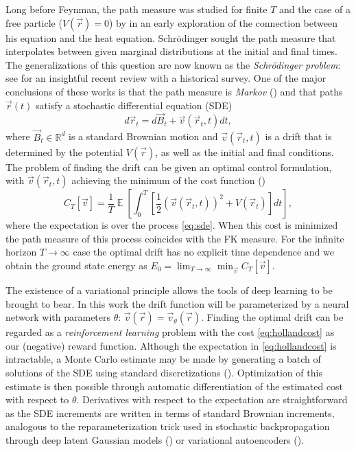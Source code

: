\documentclass[12pt]{msml2020} %
\DeclareMathOperator*{\E}{\mathbb{E}}
\begin{document}
Long before Feynman, the path measure was studied for finite $T$ and the case of a free particle ($V(\vec{r})=0$) by \cite{Schrodinger:1931aa,Schrodinger:1932aa} in an early exploration of the connection between his equation and the heat equation. Schr\"odinger sought the path measure that interpolates between given marginal distributions at the initial and final times. The generalizations of this question are now known as the \emph{Schr\"odinger problem}: see \cite{Leonard:2014aa} for an insightful recent review with a historical survey. One of the major conclusions of these works is that the path measure is \emph{Markov} (\cite{Jamison:1974aa}) and that paths $\vec{r}(t)$ satisfy a stochastic differential equation (SDE)
%
\begin{equation}\label{eq:sde}
  d\vec{r}_t = d\vec{B}_t + \vec{v}(\vec{r}_t,t)dt,
\end{equation}
%
where $\vec{B}_t\in \mathbb{R}^d$ is a standard Brownian motion and $\vec{v}(\vec{r}_t,t)$ is a drift that is determined by the potential $V(\vec{r})$, as well as the initial and final conditions. The problem of finding the drift can be given an optimal control formulation, with $\vec{v}(\vec{r}_t,t)$ achieving the minimum of the cost function (\cite{Holland:1977aa,Fleming:1977aa})
%
\begin{equation}\label{eq:hollandcost}
  C_T[\vec{v}] = \frac{1}{T}\E\left[\int_0^T\left[\frac{1}{2}(\vec{v}(\vec{r}_t,t))^2 + V(\vec{r}_t)\right]dt\right],
\end{equation}
%
where the expectation is over the process \eqref{eq:sde}. When this cost is minimized the path measure of this process coincides with the FK measure. For the infinite horizon $T\to\infty$ case the optimal drift has no explicit time dependence and we obtain the ground state energy as $E_0 = \lim_{T\to\infty} \min_{\vec{v}} C_T[\vec{v}]$.

The existence of a variational principle allows the tools of deep learning to be brought to bear. In this work the drift function will be parameterized by a neural network with parameters $\theta$: $\vec{v}(\vec{r})=\vec{v}_\theta(\vec{r})$. Finding the optimal drift can be regarded as a \emph{reinforcement learning} problem with the cost \eqref{eq:hollandcost} as our (negative) reward function. Although the expectation in \eqref{eq:hollandcost} is intractable, a Monte Carlo estimate may be made by generating a batch of solutions of the SDE using standard discretizations (\cite{Kloeden:2013aa}). Optimization of this estimate is then possible through automatic differentiation of the estimated cost with respect to $\theta$. Derivatives with respect to the expectation are straightforward as the SDE increments are written in terms of standard Brownian increments, analogous to the reparameterization trick used in stochastic backpropagation through deep latent Gaussian models (\cite{Rezende:2014aa}) or variational autoencoders (\cite{Kingma:2013aa}).
\end{document}
